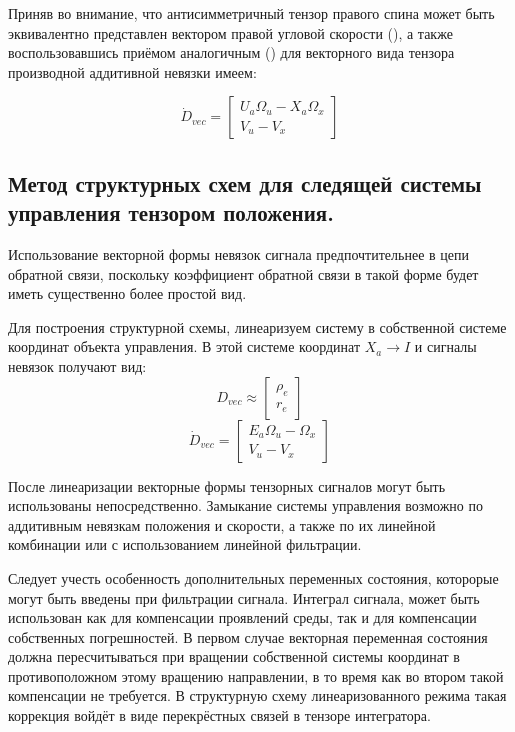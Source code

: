 \documentclass[a4paper]{article}
\begin{document}
Приняв во внимание, что антисимметричный тензор правого спина может быть эквивалентно представлен вектором правой угловой скорости (), а также воспользовавшись приёмом аналогичным () для векторного вида тензора производной аддитивной невязки имеем:

\begin{equation}\dot{D}_{vec} = \begin{bmatrix}U_a\Omega_u-X_a\Omega_x\\ V_u-V_x\end{bmatrix}\end{equation}

\subsection {Метод структурных схем для следящей системы управления тензором положения.}
Использование векторной формы невязок сигнала предпочтительнее в цепи обратной связи, поскольку коэффициент обратной связи в такой форме будет иметь существенно более простой вид.

Для построения структурной схемы, линеаризуем систему в собственной системе координат объекта управления.
В этой системе координат $X_a\rightarrow I$ и сигналы невязок получают вид:
\begin{equation} D_{vec} \approx \begin{bmatrix}\rho_e\\r_e\end{bmatrix} \end{equation}
\begin{equation}\dot{D}_{vec} = \begin{bmatrix}E_a\Omega_u-\Omega_x\\ V_u-V_x\end{bmatrix}\end{equation}

После линеаризации векторные формы тензорных сигналов могут быть использованы непосредственно.
Замыкание системы управления возможно по аддитивным невязкам положения и скорости, а также по их линейной комбинации или с использованием линейной фильтрации.

Следует учесть особенность дополнительных переменных состояния, которорые могут быть введены при фильтрации сигнала. Интеграл сигнала, может быть использован как для компенсации проявлений среды, так и для компенсации собственных погрешностей. В первом случае векторная переменная состояния должна пересчитываться при вращении собственной системы координат в противоположном этому вращению направлении, в то время как во втором такой компенсации не требуется. В структурную схему линеаризованного режима такая коррекция войдёт в виде перекрёстных связей в тензоре интегратора. 
\end{document}
